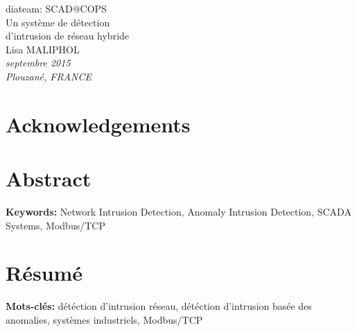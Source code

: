 \documentclass[11pt,]{article}
\begin{document}
\begin{center}

\vspace{30mm}

{\Huge diateam: SCAD@COPS}\\
\bigskip
{\Huge Un système de détection}\\
{\Huge d’intrusion de réseau hybride}\\

\vspace{30mm}
{\huge Lisa MALIPHOL}\\

\vspace{75mm}
\textit{septembre 2015}\\
\medskip
\textit{Plouzané, FRANCE}\\

\end{center}

\thispagestyle{empty} \newpage
\mbox{} \thispagestyle{empty}

\newpage

\section*{Acknowledgements}\label{acknowledgements}

\newpage
\mbox{} \thispagestyle{empty}

\clearpage

\section*{Abstract}\label{abstract}

\textbf{Keywords: }Network Intrusion Detection, Anomaly Intrusion
Detection, SCADA Systems, Modbus/TCP

\newpage
\mbox{} \thispagestyle{empty}

\clearpage

\section*{Résumé}\label{resume}

\textbf{Mots-clés: }détéction d'intrusion réseau, détéction d'intrusion
basée des anomalies, systèmes industriels, Modbus/TCP

\newpage
\mbox{} \thispagestyle{empty}
\end{document}
